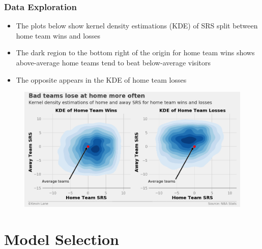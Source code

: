 \documentclass{beamer}
\begin{document}
\begin{frame}
\frametitle{Data Exploration}
\begin{itemize}
    \item The plots below show kernel density estimations (KDE) of SRS split between home team wins and losses
    \item The dark region to the bottom right of the origin for home team wins shows above-average home teams tend to beat below-average visitors
    \item The opposite appears in the KDE of home team losses
\end{itemize}
\begin{figure}
\includegraphics[scale=0.35]{../docs/assets/images/data-exploration/srs-win-loss-kde.png}
\end{figure}
\end{frame}

\section{Model Selection}
\end{document}
